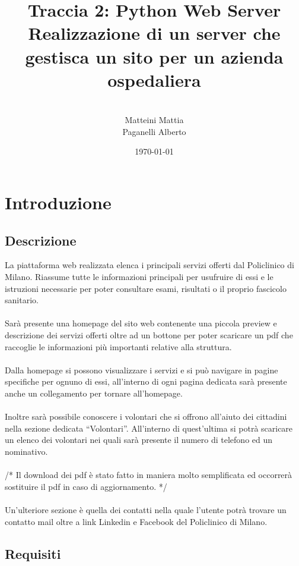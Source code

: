 \documentclass[a4paper,12pt]{report}
\title{\textbf{Traccia 2: Python Web Server}
Realizzazione di un server che gestisca un sito per un azienda ospedaliera}
\author{
\\Matteini Mattia
\\Paganelli Alberto
}
\date{\today}
\begin{document}
\maketitle

\tableofcontents


\chapter{Introduzione}

\section{Descrizione}
La piattaforma web realizzata elenca i principali servizi offerti dal Policlinico di Milano.
Riassume tutte le informazioni principali per usufruire di essi e le istruzioni necessarie per poter consultare esami, risultati o il proprio fascicolo sanitario.
\\
\\
Sarà presente una homepage del sito web contenente una piccola preview e descrizione  dei servizi offerti oltre ad un bottone per poter scaricare un pdf che raccoglie le informazioni più importanti relative alla struttura. 
\\
\\
Dalla homepage si possono visualizzare i servizi e si può navigare in pagine specifiche per ognuno di essi, all’interno di ogni pagina dedicata sarà presente anche un collegamento per tornare all’homepage.
\\
\\
Inoltre sarà possibile conoscere i volontari che si offrono all’aiuto dei cittadini nella sezione dedicata “Volontari”. 
All’interno di quest’ultima si potrà scaricare un elenco dei volontari nei quali sarà presente il numero di telefono ed un nominativo.
\\
\\
/* Il download dei pdf è stato fatto in maniera molto semplificata ed occorrerà sostituire il pdf in caso di aggiornamento. */
\\
\\
Un'ulteriore sezione è quella dei contatti nella quale l’utente potrà trovare un contatto mail oltre a link Linkedin e Facebook del Policlinico di Milano.


\clearpage

\section{Requisiti}
\end{document}
